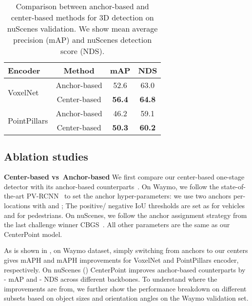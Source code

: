 \documentclass[final]{cvpr}
\begin{document}
{
\begin{table}[t]
\small
\begin{center}
\begin{tabular}{l@{\ \ }c@{\ \ }c@{\ \ }c}
  \toprule 
  Encoder & Method & mAP & NDS \\
  \midrule 
    \multirow{2}{5em}{VoxelNet}
   & Anchor-based & 52.6 & 63.0 \\
   & Center-based & \textbf{56.4} & \textbf{64.8}    \\
  \midrule
    \multirow{2}{5em}{PointPillars}
  & Anchor-based  & 46.2  & 59.1  \\ 
  & Center-based & \textbf{50.3} & \textbf{60.2}  \\
\bottomrule
 \end{tabular}
\end{center}
\vspace{-5mm}
\caption{Comparison between anchor-based and center-based methods for 3D detection on nuScenes validation. We show mean average precision (mAP) and nuScenes detection score (NDS).}
\vspace{-2mm}
\end{table}
}




\subsection{Ablation studies}
\label{ablation}

\noindent 
\textbf{Center-based vs~Anchor-based}
We first compare our center-based one-stage detector with its anchor-based counterparts~\cite{yan2018second, zhu2019classbalanced, pillar}. 
On Waymo, we follow the state-of-the-art PV-RCNN~\cite{pvrcnn} to set the anchor hyper-parameters: we use two anchors per-locations with \textdegree and \textdegree; The positive/ negative IoU thresholds are set as  for vehicles and  for pedestrians.
On nuScenes, we follow the anchor assignment strategy from the last challenge winner CBGS~\cite{zhu2019classbalanced}. 
All other parameters are the same as our CenterPoint model. 

As is shown in , on Waymo dataset, simply
switching from anchors to our centers 
gives  mAPH and  mAPH improvements for VoxelNet and PointPillars encoder, respectively.
On nuScenes () CenterPoint improves anchor-based counterparts by - mAP and - NDS across different backbones.
To understand where the improvements are from, 
we further show the performance breakdown on different subsets based on object sizes and orientation angles on the Waymo validation set.
\end{document}

